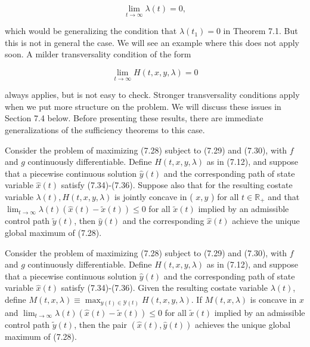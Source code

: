 \documentclass[\topdir/lecture_notes.tex]{subfiles}
\begin{document}
\[
\lim _{t \rightarrow \infty} \lambda(t)=0,
\]

which would be generalizing the condition that $\lambda\left(t_{1}\right)=0$ in Theorem 7.1. But this is not in general the case. We will see an example where this does not apply soon. A milder transversality condition of the form

\[
\lim _{t \rightarrow \infty} H(t, x, y, \lambda)=0
\]

always applies, but is not easy to check. Stronger transversality conditions apply when we put more structure on the problem. We will discuss these issues in Section 7.4 below. Before presenting these results, there are immediate generalizations of the sufficiency theorems to this case.

\begin{theorem}
Consider the problem of maximizing (7.28) subject to (7.29) and (7.30), with $f$ and $g$ continuously differentiable. Define $H(t, x, y, \lambda)$ as in (7.12), and suppose that a piecewise continuous solution $\hat{y}(t)$ and the corresponding path of state variable $\hat{x}(t)$ satisfy (7.34)-(7.36). Suppose also that for the resulting costate variable $\lambda(t), H(t, x, y, \lambda)$ is jointly concave in ( $x, y$ ) for all $t \in \mathbb{R}_{+}$ and that $\lim _{t \rightarrow \infty} \lambda(t)(\hat{x}(t)-\tilde{x}(t)) \leq 0$ for all $\tilde{x}(t)$ implied by an admissible control path $\tilde{y}(t)$, then $\hat{y}(t)$ and the corresponding $\hat{x}(t)$ achieve the unique global maximum of (7.28).
\end{theorem}

\begin{theorem}
Consider the problem of maximizing (7.28) subject to (7.29) and (7.30), with $f$ and $g$ continuously differentiable. Define $H(t, x, y, \lambda)$ as in (7.12), and suppose that a piecewise continuous solution $\hat{y}(t)$ and the corresponding path of state variable $\hat{x}(t)$ satisfy (7.34)-(7.36). Given the resulting costate variable $\lambda(t)$, define $M(t, x, \lambda) \equiv \max _{y(t) \in \mathcal{Y}(t)} H(t, x, y, \lambda)$. If $M(t, x, \lambda)$ is concave in $x$ and $\lim _{t \rightarrow \infty} \lambda(t)(\hat{x}(t)-\tilde{x}(t)) \leq 0$ for all $\tilde{x}(t)$ implied by an admissible control path $\tilde{y}(t)$, then the pair $(\hat{x}(t), \hat{y}(t))$ achieves the unique global maximum of (7.28).
\end{theorem}
\end{document}
